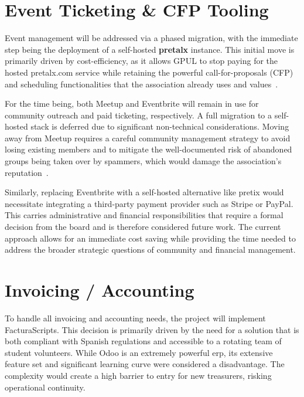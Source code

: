 \section{Event Ticketing \& CFP Tooling}

Event management will be addressed via a phased migration, with the immediate step being the deployment of a self-hosted \textbf{pretalx} instance. This initial move is primarily driven by cost-efficiency, as it allows GPUL to stop paying for the hosted pretalx.com service while retaining the powerful call-for-proposals (CFP) and scheduling functionalities that the association already uses and values~\cite{pretalx-docs}.

For the time being, both Meetup and Eventbrite will remain in use for community outreach and paid ticketing, respectively. A full migration to a self-hosted stack is deferred due to significant non-technical considerations. Moving away from Meetup requires a careful community management strategy to avoid losing existing members and to mitigate the well-documented risk of abandoned groups being taken over by spammers, which would damage the association's reputation~\cite{combuilders-meetup-takeover}.

Similarly, replacing Eventbrite with a self-hosted alternative like pretix would necessitate integrating a third-party payment provider such as Stripe or PayPal. This carries administrative and financial responsibilities that require a formal decision from the board and is therefore considered future work. The current approach allows for an immediate cost saving while providing the time needed to address the broader strategic questions of community and financial management.

\section{Invoicing / Accounting}

To handle all invoicing and accounting needs, the project will implement FacturaScripts. This decision is primarily driven by the need for a solution that is both compliant with Spanish regulations and accessible to a rotating team of student volunteers. While Odoo is an extremely powerful \gls{erp}, its extensive feature set and significant learning curve were considered a disadvantage. The complexity would create a high barrier to entry for new treasurers, risking operational continuity.

